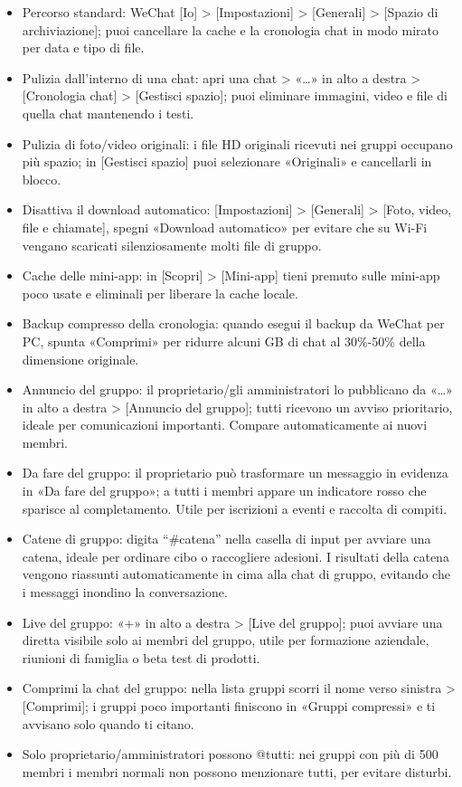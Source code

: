 \begin{itemize}
  \item Percorso standard: WeChat [Io] > [Impostazioni] > [Generali] > [Spazio di archiviazione]; puoi cancellare la cache e la cronologia chat in modo mirato per data e tipo di file.
  \item Pulizia dall'interno di una chat: apri una chat > «…» in alto a destra > [Cronologia chat] > [Gestisci spazio]; puoi eliminare immagini, video e file di quella chat mantenendo i testi.
  \item Pulizia di foto/video originali: i file HD originali ricevuti nei gruppi occupano più spazio; in [Gestisci spazio] puoi selezionare «Originali» e cancellarli in blocco.
  \item Disattiva il download automatico: [Impostazioni] > [Generali] > [Foto, video, file e chiamate], spegni «Download automatico» per evitare che su Wi-Fi vengano scaricati silenziosamente molti file di gruppo.
  \item Cache delle mini-app: in [Scopri] > [Mini-app] tieni premuto sulle mini-app poco usate e eliminali per liberare la cache locale.
  \item Backup compresso della cronologia: quando esegui il backup da WeChat per PC, spunta «Comprimi» per ridurre alcuni GB di chat al 30\%-50\% della dimensione originale.
\end{itemize}


\begin{itemize}
  \item Annuncio del gruppo: il proprietario/gli amministratori lo pubblicano da «…» in alto a destra > [Annuncio del gruppo]; tutti ricevono un avviso prioritario, ideale per comunicazioni importanti. Compare automaticamente ai nuovi membri.
  \item Da fare del gruppo: il proprietario può trasformare un messaggio in evidenza in «Da fare del gruppo»; a tutti i membri appare un indicatore rosso che sparisce al completamento. Utile per iscrizioni a eventi e raccolta di compiti.
  \item Catene di gruppo: digita “\#catena” nella casella di input per avviare una catena, ideale per ordinare cibo o raccogliere adesioni. I risultati della catena vengono riassunti automaticamente in cima alla chat di gruppo, evitando che i messaggi inondino la conversazione.
  \item Live del gruppo: «+» in alto a destra > [Live del gruppo]; puoi avviare una diretta visibile solo ai membri del gruppo, utile per formazione aziendale, riunioni di famiglia o beta test di prodotti.
  \item Comprimi la chat del gruppo: nella lista gruppi scorri il nome verso sinistra > [Comprimi]; i gruppi poco importanti finiscono in «Gruppi compressi» e ti avvisano solo quando ti citano.
  \item Solo proprietario/amministratori possono @tutti: nei gruppi con più di 500 membri i membri normali non possono menzionare tutti, per evitare disturbi.
\end{itemize}


